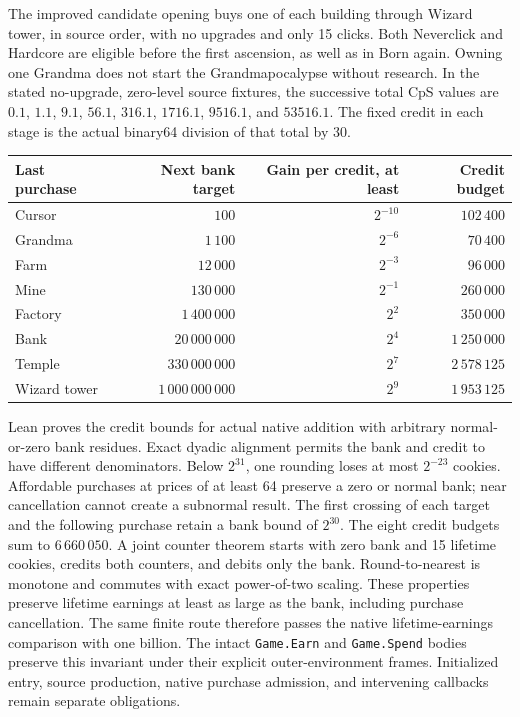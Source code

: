 \documentclass[11pt,a4paper]{article}
\numberwithin{equation}{section}
\theoremstyle{definition}
\theoremstyle{remark}
\begin{document}
The improved candidate opening buys one of each building through Wizard tower, in source order, with no upgrades and only 15 clicks. Both Neverclick and Hardcore are eligible before the first ascension, as well as in Born again. Owning one Grandma does not start the Grandmapocalypse without research. In the stated no-upgrade, zero-level source fixtures, the successive total CpS values are $0.1$, $1.1$, $9.1$, $56.1$, $316.1$, $1716.1$, $9516.1$, and $53516.1$. The fixed credit in each stage is the actual binary64 division of that total by 30.

\begin{center}
\begin{tabular}{lrrr}
\toprule
Last purchase & Next bank target & Gain per credit, at least & Credit budget\\
\midrule
Cursor & $100$ & $2^{-10}$ & $102\,400$\\
Grandma & $1\,100$ & $2^{-6}$ & $70\,400$\\
Farm & $12\,000$ & $2^{-3}$ & $96\,000$\\
Mine & $130\,000$ & $2^{-1}$ & $260\,000$\\
Factory & $1\,400\,000$ & $2^2$ & $350\,000$\\
Bank & $20\,000\,000$ & $2^4$ & $1\,250\,000$\\
Temple & $330\,000\,000$ & $2^7$ & $2\,578\,125$\\
Wizard tower & $1\,000\,000\,000$ & $2^9$ & $1\,953\,125$\\
\bottomrule
\end{tabular}
\end{center}

Lean proves the credit bounds for actual native addition with arbitrary normal-or-zero bank residues. Exact dyadic alignment permits the bank and credit to have different denominators. Below $2^{31}$, one rounding loses at most $2^{-23}$ cookies. Affordable purchases at prices of at least 64 preserve a zero or normal bank; near cancellation cannot create a subnormal result. The first crossing of each target and the following purchase retain a bank bound of $2^{30}$. The eight credit budgets sum to $6\,660\,050$. A joint counter theorem starts with zero bank and 15 lifetime cookies, credits both counters, and debits only the bank. Round-to-nearest is monotone and commutes with exact power-of-two scaling. These properties preserve lifetime earnings at least as large as the bank, including purchase cancellation. The same finite route therefore passes the native lifetime-earnings comparison with one billion. The intact \texttt{Game.Earn} and \texttt{Game.Spend} bodies preserve this invariant under their explicit outer-environment frames. Initialized entry, source production, native purchase admission, and intervening callbacks remain separate obligations.
\end{document}
